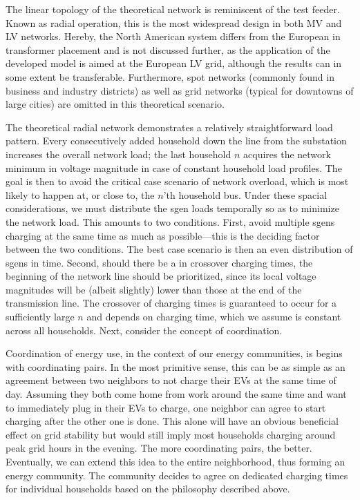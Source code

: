 \documentclass[a4paper,10pt]{report}
\begin{document}
The linear topology of the theoretical network is reminiscent of the test feeder. Known as radial operation, this is the most widespread design in both MV and LV networks. Hereby, the North American system differs from the European in transformer placement and is not discussed further, as the application of the developed model is aimed at the European LV grid, although the results can in some extent be transferable. Furthermore, spot networks (commonly found in business and industry districts) as well as grid networks (typical for downtowns of large cities) are omitted in this theoretical scenario.

The theoretical radial network demonstrates a relatively straightforward load pattern. Every consecutively added household down the line from the substation increases the overall network load; the last household $n$ acquires the network minimum in voltage magnitude in case of constant household load profiles. The goal is then to avoid the critical case scenario of network overload, which is most likely to happen at, or close to, the $n$'th household bus. Under these spacial considerations, we must distribute the sgen loads temporally so as to minimize the network load. This amounts to two conditions. First, avoid multiple sgens charging at the same time as much as possible---this is the deciding factor between the two conditions. The best case scenario is then an even distribution of sgens in time. Second, should there be a in crossover charging times, the beginning of the network line should be prioritized, since its local voltage magnitudes will be (albeit slightly) lower than those at the end of the transmission line. The crossover of charging times is guaranteed to occur for a sufficiently large $n$ and depends on charging time, which we assume is constant across all households. Next, consider the concept of coordination.

Coordination of energy use, in the context of our energy communities, is begins with coordinating pairs. In the most primitive sense, this can be as simple as an agreement between two neighbors to not charge their EVs at the same time of day. Assuming they both come home from work around the same time and want to immediately plug in their EVs to charge, one neighbor can agree to start charging after the other one is done. This alone will have an obvious beneficial effect on grid stability but would still imply most households charging around peak grid hours in the evening. The more coordinating pairs, the better. Eventually, we can extend this idea to the entire neighborhood, thus forming an energy community. The community decides to agree on dedicated charging times for individual households based on the philosophy described above.
\end{document}
